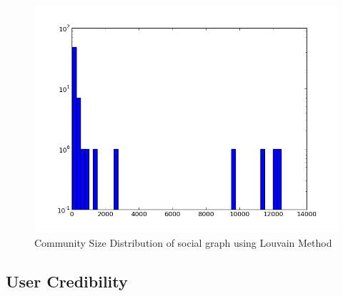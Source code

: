 \documentclass[10pt]{article}
\begin{document}
\begin{figure}[ht]
\includegraphics[scale=.4]{social_community_dist.png} 
\caption{Community Size Distribution of social graph using Louvain Method}
\label{fig:social_community_dist}
\endminipage\hfill
\end{figure}


\FloatBarrier
\subsection{User Credibility}
\label{sec:user_credibility}
\end{document}
